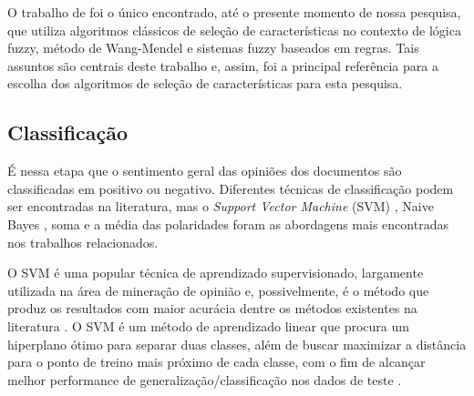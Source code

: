 \documentclass[template.tex]{subfiles}
\begin{document}
O trabalho de  foi o único encontrado, até o presente momento de nossa pesquisa, que utiliza algoritmos clássicos de seleção de características no contexto de lógica fuzzy, método de Wang-Mendel e sistemas fuzzy baseados em regras. Tais assuntos são centrais deste trabalho e, assim,  foi a principal referência para a escolha dos algoritmos de seleção de características para esta pesquisa.

\subsection{Classificação}

%
%
%
%
%

É nessa etapa que o sentimento geral das opiniões dos documentos são classificadas em positivo ou negativo. Diferentes técnicas de classificação podem ser encontradas na literatura, mas o \textit{Support Vector Machine} (SVM) \cite{pang2002thumbs, pang2004sentimental, tsutsumi2007movie, prabowo2009sentiment}, Naive Bayes \cite{pang2002thumbs, pang2004sentimental}, soma \cite{ohana2011domain, avancco2014lexicon} e a média \cite{turney2002thumbs, voll2007not, taboada2008extracting, taboada2011lexicon} das polaridades foram as abordagens mais encontradas nos trabalhos relacionados.

O SVM é uma popular técnica de aprendizado supervisionado, largamente utilizada na área de mineração de opinião e, possivelmente, é o método que produz os resultados com maior acurácia dentre os métodos existentes na literatura \cite{moraes2012document}. O SVM é um método de aprendizado linear que procura um hiperplano ótimo para separar duas classes, além de buscar maximizar a distância para o ponto de treino mais próximo de cada classe, com o fim de alcançar melhor performance de generalização/classificação nos dados de teste \cite{friedman2001elements}.
\end{document}
